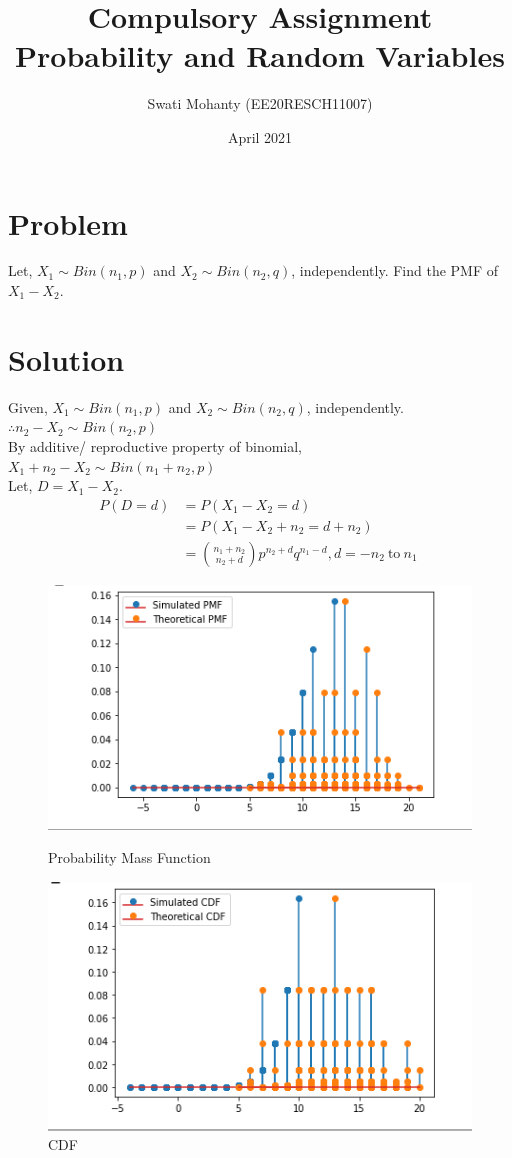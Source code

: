\documentclass[journal,12pt,twocolumn]{IEEEtran}
\title{Compulsory Assignment
\\Probability and Random Variables }
\author{Swati Mohanty (EE20RESCH11007) }
\date{April 2021}
\begin{document}
\maketitle

\section{Problem}
Let, $X_1 \sim Bin(n_1, p)$ and $X_2 \sim Bin(n_2, q)$, independently. Find the PMF of $X_1 - X_2.$
\section{Solution}
Given, $X_1 \sim Bin(n_1, p)$ and $X_2 \sim Bin(n_2, q)$, independently.\\
$\therefore n_2-X_2 \sim Bin(n_2, p)$\\
By additive/ reproductive property of binomial,\\
$X_1+n_2-X_2 \sim Bin(n_1+n_2, p)$\\
Let, $D= X_1 -X_2$.
\begin{align}
    P(D=d) &= P(X_1 -X_2 = d)\\
    &= P(X_1 -X_2 +n_2 = d +n_2)\\
    &= \binom{n_1+n_2}{n_2+d} p^{n_2+d} q^{n_1-d}, d= -n_2\ \text{to}\ n_1\ \label{subtraction}
\end{align}
\begin{figure}[!ht]
\centering
\includegraphics[width=\columnwidth]{comp pmf.PNG}
\caption{Probability Mass Function}
\label{fig:pmf}
\includegraphics[width=\columnwidth]{comp cdf.PNG}
\caption{CDF}
\label{fig:cdf}
\end{figure}
\end{document}

